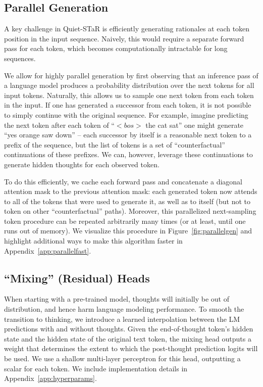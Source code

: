\documentclass{article} %
\begin{document}
\subsection{Parallel Generation}
\label{sec:parallel}
A key challenge in Quiet-STaR is efficiently generating rationales at each token position in the input sequence. Naively, this would require a separate forward pass for each token, which becomes computationally intractable for long sequences.

We allow for highly parallel generation by first observing that an inference pass of a language model produces a probability distribution over the next tokens for all input tokens. Naturally, this allows us to sample one next token from each token in the input. If one has generated a successor from each token, it is not possible to simply continue with the original sequence.
For example, imagine predicting the next token after each token of ``$<bos>$ the cat sat'' one might generate ``yes orange saw down'' -- each successor by itself is a reasonable next token to a prefix of the sequence, but the list of tokens is a set of ``counterfactual'' continuations of these prefixes. 
We can, however, leverage these continuations to generate hidden thoughts for each observed token.

To do this efficiently, we cache each forward pass and concatenate a diagonal attention mask to the previous attention mask: each generated token now attends to all of the tokens that were used to generate it, as well as to itself (but not to token on other ``counterfactual'' paths). Moreover, this parallelized next-sampling token procedure can be repeated arbitrarily many times (or at least, until one runs out of memory). We visualize this procedure in Figure~\ref{fig:parallelgen} and highlight additional ways to make this algorithm faster in Appendix~\ref{app:parallelfast}.

\subsection{``Mixing'' (Residual) Heads}\vspace{-3px}
\label{sec:mixing}
When starting with a pre-trained model, thoughts will initially be out of distribution, and hence harm language modeling performance.
To smooth the transition to thinking, 
we introduce a learned interpolation between the LM predictions with and without thoughts. Given the end-of-thought token's hidden state and the hidden state of the original text token, the mixing head outputs a weight that determines the extent to which the post-thought prediction logits will be used. We use a shallow multi-layer perceptron for this head, outputting a scalar for each token. We include implementation details in Appendix~\ref{app:hyperparams}.
\end{document}
